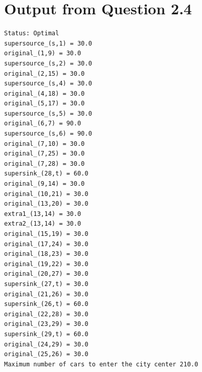 \documentclass[10pt]{article}
\begin{document}
\section{Output from Question 2.4} %
\label{sec:output_from_question_2_4}
\begin{lstlisting}
Status: Optimal
supersource_(s,1) = 30.0
original_(1,9) = 30.0
supersource_(s,2) = 30.0
original_(2,15) = 30.0
supersource_(s,4) = 30.0
original_(4,18) = 30.0
original_(5,17) = 30.0
supersource_(s,5) = 30.0
original_(6,7) = 90.0
supersource_(s,6) = 90.0
original_(7,10) = 30.0
original_(7,25) = 30.0
original_(7,28) = 30.0
supersink_(28,t) = 60.0
original_(9,14) = 30.0
original_(10,21) = 30.0
original_(13,20) = 30.0
extra1_(13,14) = 30.0
extra2_(13,14) = 30.0
original_(15,19) = 30.0
original_(17,24) = 30.0
original_(18,23) = 30.0
original_(19,22) = 30.0
original_(20,27) = 30.0
supersink_(27,t) = 30.0
original_(21,26) = 30.0
supersink_(26,t) = 60.0
original_(22,28) = 30.0
original_(23,29) = 30.0
supersink_(29,t) = 60.0
original_(24,29) = 30.0
original_(25,26) = 30.0
Maximum number of cars to enter the city center 210.0
\end{lstlisting}





\end{document}
